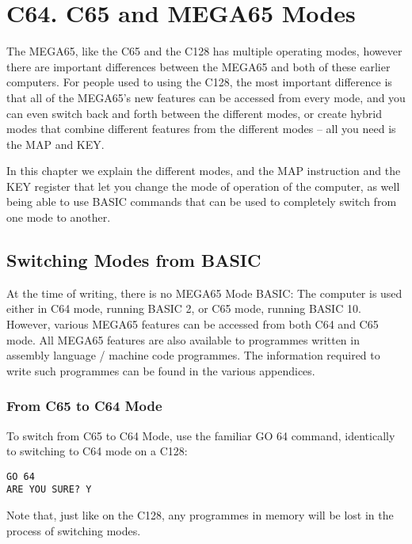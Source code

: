 \chapter {C64. C65 and MEGA65 Modes}
\label{cha:modes}

The MEGA65, like the C65 and the C128 has multiple operating modes,
however there are important differences between the MEGA65 and both
of these earlier computers.  For people used to using the C128,
the most important difference is that all of the MEGA65's new features
can be accessed from every mode, and you can even switch back and forth
between the different modes, or create hybrid modes that combine different
features from the different modes -- all you need is the MAP and KEY.

In this chapter we explain the different modes, and the MAP instruction and
the KEY register that let you change the mode of operation of the computer,
as well being able to use BASIC commands that can be used to completely switch
from one mode to another.

\section{Switching Modes from BASIC}

At the time of writing, there is no MEGA65 Mode BASIC: The computer is used either
in C64 mode, running BASIC 2, or C65 mode, running BASIC 10.  However, various MEGA65
features can be accessed from both C64 and C65 mode.  All MEGA65 features are also available
to programmes written in assembly language / machine code programmes.  The information required
to write such programmes can be found in the various appendices. 

\subsection{From C65 to C64 Mode}

To switch from C65 to C64 Mode, use the familiar GO 64 command, identically to switching to C64
mode on a C128:

\begin{tcolorbox}[colback=black,coltext=white]
\verbatimfont{\codefont}
\begin{verbatim}
GO 64
ARE YOU SURE? Y
\end{verbatim}
\end{tcolorbox}

Note that, just like on the C128, any programmes in memory will be lost in the process of switching modes.

